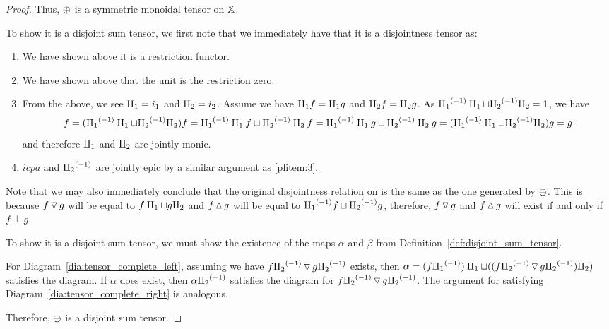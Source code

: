 \begin{proof}
  Thus, $\oplus$ is a symmetric monoidal tensor on $\mathbb{X}$.

  To show it is a disjoint sum tensor, we first note that we immediately have that it is a
  disjointness tensor as:
    \begin{enumerate}[{(}i{)}]
      \item We have shown above it is a restriction functor.
      \item We have shown above that the unit is the restriction zero.
      \item From the above, we see $\amalg_{1} = i_1$ and $\amalg_{2} = i_2$. Assume we have $\amalg_{1} f = \amalg_{1} g$
        and $\amalg_{2} f = \amalg_{2} g$. As ${\amalg_{1}}^{(-1)} \amalg_{1} \sqcup {\amalg_{2}}^{(-1)} \amalg_{2} = 1$, we have
        \[
           f = ({\amalg_{1}}^{(-1)} \amalg_{1} \sqcup {\amalg_{2}}^{(-1)} \amalg_{2}) f = {\amalg_{1}}^{(-1)} \amalg_{1} f \sqcup {\amalg_{2}}^{(-1)} \amalg_{2} f = {\amalg_{1}}^{(-1)} \amalg_{1} g
           \sqcup {\amalg_{2}}^{(-1)} \amalg_{2} g =  ({\amalg_{1}}^{(-1)} \amalg_{1} \sqcup {\amalg_{2}}^{(-1)} \amalg_{2}) g = g
        \]
        and therefore $\amalg_{1}$ and $\amalg_{2}$ are jointly monic.\label{pfitem:3}
      \item $icpa$ and ${\amalg_{2}}^{(-1)}$ are jointly epic by a similar argument as \ref{pfitem:3}.
    \end{enumerate}

  Note that we may also immediately conclude that the original disjointness relation on \X is the
  same as the one generated by $\oplus$. This is because $f \operatorname{\triangledown} g$ will be equal to $f\amalg_{1} \sqcup
  g\amalg_{2}$ and $f \operatorname{\vartriangle} g$ will be equal to ${\amalg_{1}}^{(-1)} f \sqcup {\amalg_{2}}^{(-1)} g$, therefore, $f\operatorname{\triangledown} g$ and $f
  \operatorname{\vartriangle} g$ will exist if and only if $f\perp g$.

  To show it is a disjoint sum tensor, we must show the existence of the maps $\alpha$ and $\beta$
  from Definition~\ref{def:disjoint_sum_tensor}.

  For Diagram~\ref{dia:tensor_complete_left}, assuming we have $f{\amalg_{2}}^{(-1)} \operatorname{\triangledown} g{\amalg_{2}}^{(-1)}$ exists,
  then $\alpha = (f{\amalg_{1}}^{(-1)})\amalg_{1} \sqcup ((f{\amalg_{2}}^{(-1)} \operatorname{\triangledown} g {\amalg_{2}}^{(-1)})\amalg_{2})$ satisfies the diagram. If
  $\alpha$ does exist, then $\alpha {\amalg_{2}}^{(-1)}$ satisfies the diagram for $f{\amalg_{2}}^{(-1)} \operatorname{\triangledown} g{\amalg_{2}}^{(-1)}$. The
  argument for satisfying Diagram~\ref{dia:tensor_complete_right} is analogous.

  Therefore, $\oplus$ is a disjoint sum tensor.
\end{proof}



